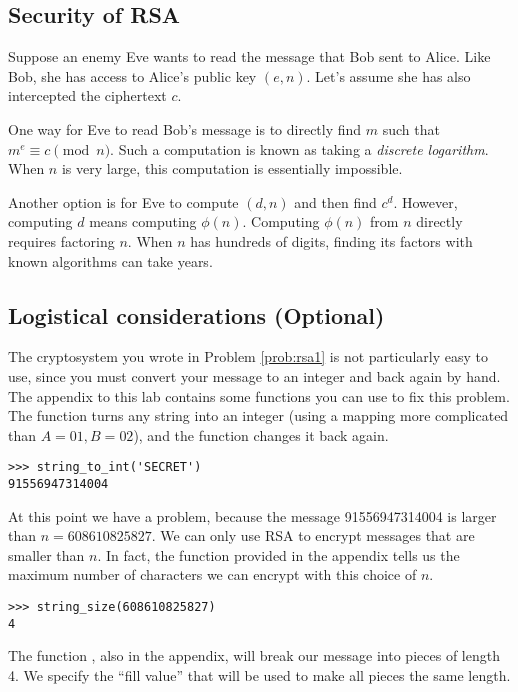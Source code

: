 \subsection*{Security of RSA}
Suppose an enemy Eve wants to read the message that Bob sent to Alice.
Like Bob, she has access to Alice's public key $(e, n)$.
Let's assume she has also intercepted the ciphertext $c$.

One way for Eve to read Bob's message is to directly find $m$ such that $m^e \equiv c \pmod{n}$.
Such a computation is known as taking a \emph{discrete logarithm}.
When $n$ is very large, this computation is essentially impossible.

Another option is for Eve to compute $(d, n)$ and then find $c^d$.
However, computing $d$ means computing $\phi(n)$.
Computing $\phi(n)$ from $n$ directly requires factoring $n$.
When $n$ has hundreds of digits, finding its factors with known algorithms can take years.



\subsection*{Logistical considerations (Optional)}
The cryptosystem you wrote in Problem \ref{prob:rsa1} is not particularly easy to use, since you must convert your message to an integer and back again by hand.
The appendix to this lab contains some functions you can use to fix this problem.
The function  turns any string into an integer (using a mapping more complicated than $A=01, B=02$), and the function  changes it back again.

\begin{lstlisting}
>>> string_to_int('SECRET')
91556947314004
\end{lstlisting}

At this point we have a problem, because the message 91556947314004 is larger than $n=608610825827$.
We can only use RSA to encrypt messages that are smaller than $n.$
In fact, the function  provided in the appendix tells us the maximum number of characters we can encrypt with this choice of $n$.

\begin{lstlisting}
>>> string_size(608610825827)
4
\end{lstlisting}

The function , also in the appendix, will break our message into pieces of length 4.
We specify the ``fill value''  that will be used to make all pieces the same length.

